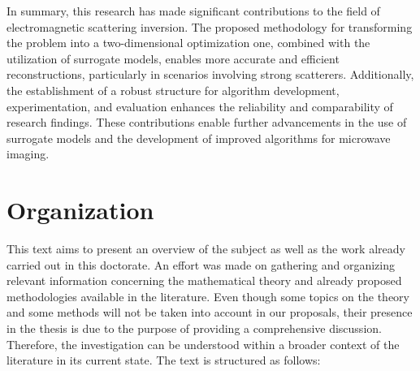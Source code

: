 		In summary, this research has made significant contributions to the field of electromagnetic scattering inversion. The proposed methodology for transforming the problem into a two-dimensional optimization one, combined with the utilization of surrogate models, enables more accurate and efficient reconstructions, particularly in scenarios involving strong scatterers. Additionally, the establishment of a robust structure for algorithm development, experimentation, and evaluation enhances the reliability and comparability of research findings. These contributions enable further advancements in the use of surrogate models and the development of improved algorithms for microwave imaging.
	
	\section{Organization}\label{chap:introduction:organization}
	
		This text aims to present an overview of the subject as well as the work already carried out in this doctorate. An effort was made on gathering and organizing relevant information concerning the mathematical theory and already proposed methodologies available in the literature. Even though some topics on the theory and some methods will not be taken into account in our proposals, their presence in the thesis is due to the purpose of providing a comprehensive discussion. Therefore, the investigation can be understood within a broader context of the literature in its current state. The text is structured as follows:
		
